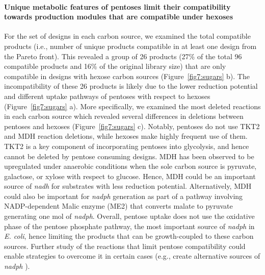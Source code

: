 {\paragraph{Unique metabolic features of pentoses limit their compatibility towards production modules that are compatible under hexoses}
For the set of designs in each carbon source, we examined the total compatible products (i.e., number of unique products compatible in at least one design from the Pareto front).
This revealed a group of 26 products (27\% of the total 96 compatible products and 16\% of the original library size) that are only compatible in designs with hexose carbon sources  (Figure~\ref{fig7:sugars} b).
The incompatibility of these 26 products is likely due to the
 lower reduction potential and different uptake pathways of pentoses with respect to hexoses (Figure~\ref{fig7:sugars} a).
More specifically, we examined the most deleted reactions in each carbon source which revealed several differences in deletions between pentoses and hexoses (Figure~\ref{fig7:sugars} c).
Notably, pentoses do not use TKT2 and MDH reaction deletions, while hexoses make highly frequent use of them.
TKT2 is a key component of incorporating pentoses into glycolysis, and hence cannot be deleted by pentose consuming designs.
MDH  has been observed to be upregulated under anaerobic conditions when the sole carbon source is pyruvate, galactose, or xylose with respect to glucose.\citep{park1995}
Hence, MDH could be an important source of \textit{nadh} for substrates with less reduction potential.
Alternatively, MDH could also be important for \textit{nadph} generation as part of a pathway involving NADP-dependent Malic enzyme (ME2) that converts malate to pyruvate generating one mol of \textit{nadph}. %
Overall, pentose uptake does not use the oxidative phase of the pentose phosphate pathway, the most important source of \textit{nadph} in \textit{E. coli},\citep{christodoulou2018}
hence limiting the products that can be growth-coupled to these carbon sources.
Further study of the reactions that limit pentose compatibility could enable strategies to overcome it in certain cases (e.g., create alternative sources of \textit{nadph} \citep{lee2013, ng2015c}).

}
